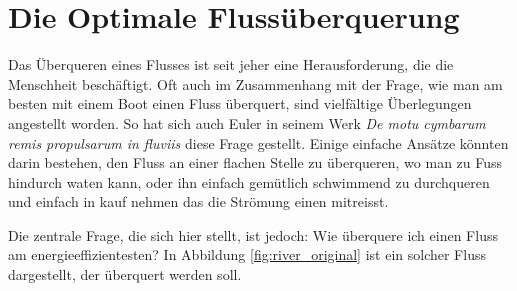 %
%
%
%
\chapter{Die Optimale Flussüberquerung\label{chapter:schwimmen}}
\begin{refsection}
	
	
Das Überqueren eines Flusses ist seit jeher eine Herausforderung, die die Menschheit beschäftigt. Oft auch im Zusammenhang mit der Frage, wie man am besten mit einem Boot einen Fluss überquert, sind vielfältige Überlegungen angestellt worden. So hat sich auch Euler in seinem Werk \textit{De motu cymbarum remis propulsarum in fluviis} \cite{schwimmen:Euler_works} diese Frage gestellt. Einige einfache Ansätze könnten darin bestehen, den Fluss an einer flachen Stelle zu überqueren, wo man zu Fuss hindurch waten kann, oder ihn einfach gemütlich schwimmend zu durchqueren und einfach in kauf nehmen das die Strömung einen mitreisst.
	
	
Die zentrale Frage, die sich hier stellt, ist jedoch: Wie überquere ich einen Fluss am energieeffizientesten? In Abbildung \ref{fig:river_original} ist ein solcher Fluss dargestellt, der überquert werden soll.




\begin{figure}
    \centering

    \begin{tikzpicture}[x=0.75pt,y=0.75pt,yscale=-1,xscale=1]


\end{tikzpicture}
\end{figure}
\end{refsection}
